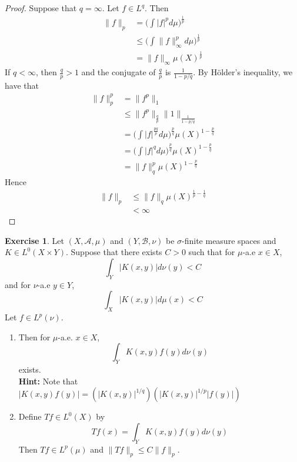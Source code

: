 \documentclass[12pt]{amsart}
\theoremstyle{definition}
\newtheorem{ex}[definition]{Exercise}
\newcommand{\sig}{\sigma}
\newcommand{\MA}{\mathcal{A}}
\newcommand{\MB}{\mathcal{B}}
\newcommand{\lex}[1]{\label{ex:#1}}
\begin{document}
	\begin{proof}
		Suppose that $q = \infty$. Let $f \in L^q$. Then
		\begin{align*}
			\|f \|_p 
			&= \bigg(\int \vert f \vert^p d \mu \bigg)^{\frac{1}{p}} \\
			& \leq \bigg(\int \| f \|_{\infty} ^p d \mu \bigg)^{\frac{1}{p}} \\
			&= \|f \|_{\infty} \mu(X)^{\frac{1}{p}}
		\end{align*} 
		If $q < \infty$, then $\frac{q}{p} > 1$ and the conjugate of $\frac{q}{p}$ is $\frac{1}{1- p/q}$. By Hölder's inequality, we have that 
		\begin{align*}
			\|f \|_p^p 
			&= \|f^p \|_1 \\
			&\leq \|f^p \|_{\frac{q}{p}} \|1 \|_{\frac{1}{1-p/q}} \\
			&= \bigg(\int |f|^{\frac{pq}{p}} d \mu \bigg)^{\frac{p}{q}} \mu(X)^{1-\frac{p}{q}} \\
			&= \bigg(\int |f|^{q} d \mu \bigg)^{\frac{p}{q}}\mu(X)^{1-\frac{p}{q}} \\
			&= \|f \|_q^p\mu(X)^{1-\frac{p}{q}}
		\end{align*}
		Hence 
		\begin{align*}
			\|f \|_p 
			&\leq \|f \|_q\mu(X)^{\frac{1}{p}-\frac{1}{q}} \\
			&< \infty
		\end{align*}
	\end{proof}
	
	\begin{ex} \lex{00000} 
	Let $(X, \MA, \mu)$ and $(Y, \MB, \nu)$ be $\sig$-finite measure spaces and $K\in L^0(X \times Y)$. Suppose that there exists $C > 0$ such that for $\mu$-a.e $x \in X$, $$\int_Y |K(x, y)| d \nu(y) < C$$ and for $\nu$-a.e $y \in Y$, $$\int_X |K(x, y)| d \mu(x) < C$$
	Let $f \in L^p(\nu)$.
	\begin{enumerate}
	\item Then for $\mu$-a.e. $x \in X$, $$\int_Y K(x,y) f(y) d \nu(y)$$ exists. \\
	\textbf{Hint:} Note that $|K(x, y) f(y)| = (|K(x,y)|^{1/q})(|K(x,y)|^{1/p}|f(y)|)$
	\item Define $Tf \in L^0(X)$ by $$Tf(x) = \int_Y K(x, y) f(y)d \nu(y)$$ Then $Tf \in L^p(\mu)$ and $\|Tf\|_p \leq C\|f\|_p$. 
	\end{enumerate}
	\end{ex}
	
\end{document}
